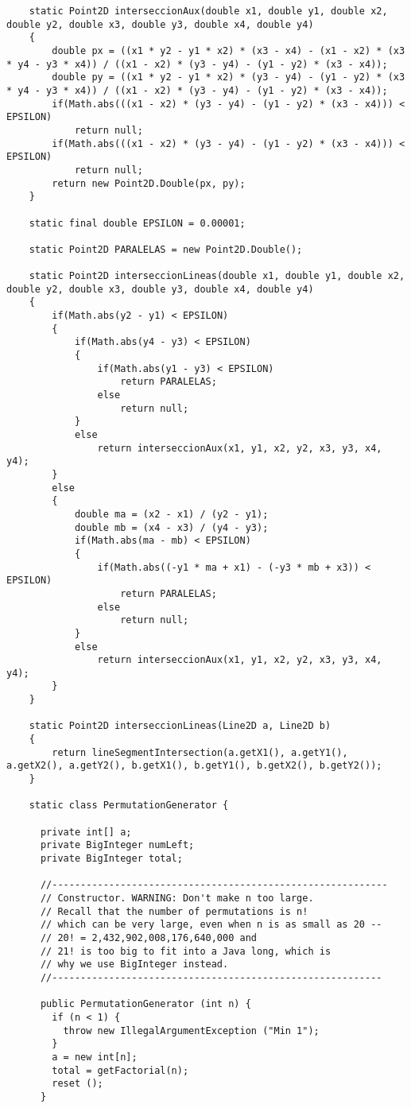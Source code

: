 \documentclass[a4paper, 11pt, oneside]{report}
\begin{document}
\begin{verbatim}
	static Point2D interseccionAux(double x1, double y1, double x2, double y2, double x3, double y3, double x4, double y4)
	{
		double px = ((x1 * y2 - y1 * x2) * (x3 - x4) - (x1 - x2) * (x3 * y4 - y3 * x4)) / ((x1 - x2) * (y3 - y4) - (y1 - y2) * (x3 - x4));
		double py = ((x1 * y2 - y1 * x2) * (y3 - y4) - (y1 - y2) * (x3 * y4 - y3 * x4)) / ((x1 - x2) * (y3 - y4) - (y1 - y2) * (x3 - x4));
		if(Math.abs(((x1 - x2) * (y3 - y4) - (y1 - y2) * (x3 - x4))) < EPSILON)
			return null;
		if(Math.abs(((x1 - x2) * (y3 - y4) - (y1 - y2) * (x3 - x4))) < EPSILON)
			return null;
		return new Point2D.Double(px, py);
	}

	static final double EPSILON = 0.00001;
	
	static Point2D PARALELAS = new Point2D.Double();
	
	static Point2D interseccionLineas(double x1, double y1, double x2, double y2, double x3, double y3, double x4, double y4)
	{
		if(Math.abs(y2 - y1) < EPSILON)
		{
			if(Math.abs(y4 - y3) < EPSILON)
			{
				if(Math.abs(y1 - y3) < EPSILON)
					return PARALELAS;
				else
					return null;
			}
			else
				return interseccionAux(x1, y1, x2, y2, x3, y3, x4, y4);
		}
		else
		{
			double ma = (x2 - x1) / (y2 - y1);
			double mb = (x4 - x3) / (y4 - y3);
			if(Math.abs(ma - mb) < EPSILON)
			{
				if(Math.abs((-y1 * ma + x1) - (-y3 * mb + x3)) < EPSILON)
					return PARALELAS;
				else
					return null;
			}
			else
				return interseccionAux(x1, y1, x2, y2, x3, y3, x4, y4);
		}
	}
	
	static Point2D interseccionLineas(Line2D a, Line2D b)
	{
		return lineSegmentIntersection(a.getX1(), a.getY1(), a.getX2(), a.getY2(), b.getX1(), b.getY1(), b.getX2(), b.getY2());
	}
	
	static class PermutationGenerator {

	  private int[] a;
	  private BigInteger numLeft;
	  private BigInteger total;

	  //-----------------------------------------------------------
	  // Constructor. WARNING: Don't make n too large.
	  // Recall that the number of permutations is n!
	  // which can be very large, even when n is as small as 20 --
	  // 20! = 2,432,902,008,176,640,000 and
	  // 21! is too big to fit into a Java long, which is
	  // why we use BigInteger instead.
	  //----------------------------------------------------------

	  public PermutationGenerator (int n) {
	    if (n < 1) {
	      throw new IllegalArgumentException ("Min 1");
	    }
	    a = new int[n];
	    total = getFactorial(n);
	    reset ();
	  }


\end{verbatim}
\end{document}
